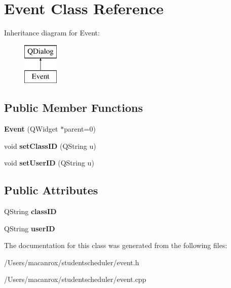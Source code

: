 \hypertarget{class_event}{\section{Event Class Reference}
\label{class_event}
}
Inheritance diagram for Event\-:\begin{figure}[H]
\begin{center}
\leavevmode
\includegraphics[height=2.000000cm]{class_event}
\end{center}
\end{figure}
\subsection*{Public Member Functions}
\begin{DoxyCompactItemize}
\item 
\hypertarget{class_event_a02c9634eb9174410221f9459a54d7b7f}{{\bfseries Event} (Q\-Widget $\ast$parent=0)}\label{class_event_a02c9634eb9174410221f9459a54d7b7f}

\item 
\hypertarget{class_event_afd2884ff536f352fb4e18debf464f054}{void {\bfseries set\-Class\-I\-D} (Q\-String u)}\label{class_event_afd2884ff536f352fb4e18debf464f054}

\item 
\hypertarget{class_event_a5ab5b77b1671c8346fe8233eecd4f097}{void {\bfseries set\-User\-I\-D} (Q\-String u)}\label{class_event_a5ab5b77b1671c8346fe8233eecd4f097}

\end{DoxyCompactItemize}
\subsection*{Public Attributes}
\begin{DoxyCompactItemize}
\item 
\hypertarget{class_event_a8c3804a90d58066d02c51a0cc6890bac}{Q\-String {\bfseries class\-I\-D}}\label{class_event_a8c3804a90d58066d02c51a0cc6890bac}

\item 
\hypertarget{class_event_a9b3528e0db0f3a842ca9b4be33743ca8}{Q\-String {\bfseries user\-I\-D}}\label{class_event_a9b3528e0db0f3a842ca9b4be33743ca8}

\end{DoxyCompactItemize}


The documentation for this class was generated from the following files\-:\begin{DoxyCompactItemize}
\item 
/\-Users/macanrox/studentscheduler/event.\-h\item 
/\-Users/macanrox/studentscheduler/event.\-cpp\end{DoxyCompactItemize}
